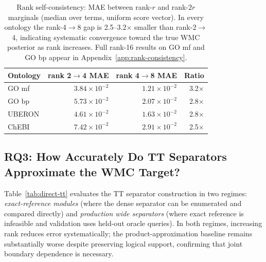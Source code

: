 \documentclass[12pt]{article}
\newcommand{\suppref}[1]{Appendix~\ref{#1}}
\begin{document}
\begin{table}[t]
\centering
\small
\begin{tabular}{lrrr}
\toprule
Ontology & rank 2$\to$4 MAE & rank 4$\to$8 MAE & Ratio \\
\midrule
GO mf  & $3.84{\times}10^{-2}$ & $1.21{\times}10^{-2}$ & 3.2$\times$ \\
GO bp  & $5.73{\times}10^{-2}$ & $2.07{\times}10^{-2}$ & 2.8$\times$ \\
UBERON & $4.61{\times}10^{-2}$ & $1.63{\times}10^{-2}$ & 2.8$\times$ \\
ChEBI  & $7.42{\times}10^{-2}$ & $2.91{\times}10^{-2}$ & 2.5$\times$ \\
\bottomrule
\end{tabular}
\caption{Rank self-consistency: MAE between rank-$r$ and rank-$2r$
marginals (median over terms, uniform score vector). In every ontology
the rank-4$\to$8 gap is 2.5--3.2$\times$ smaller than rank-2$\to$4,
indicating systematic convergence toward the true WMC posterior as rank
increases. Full rank-16 results on GO mf and GO bp appear in
\suppref{app:rank-consistency}.}
\label{tab:rank-consistency}
\end{table}

\subsection{RQ3: How Accurately Do TT Separators Approximate the WMC Target?}
\label{sec:rq3-tt}

Table~\ref{tab:direct-tt} evaluates the TT separator construction in
two regimes: \emph{exact-reference modules} (where the dense separator
can be enumerated and compared directly) and \emph{production wide
separators} (where exact reference is infeasible and validation uses
held-out oracle queries). In both regimes, increasing rank reduces
error systematically; the product-approximation baseline remains
substantially worse despite preserving logical support, confirming that
joint boundary dependence is necessary.
\end{document}
